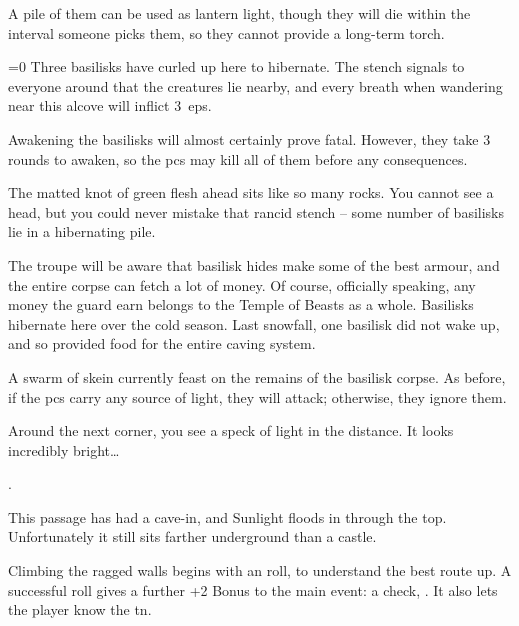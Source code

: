 \begin{multicols}{2}
A pile of them can be used as lantern light, though they will die within the \gls{interval} someone picks them, so they cannot provide a long-term torch.


\ifnum\value{temperature}=0
  Three basilisks have curled up here to hibernate.
  The stench signals to everyone around that the creatures lie nearby, and every breath when wandering near this alcove will inflict 3~\glspl{ep}.

  Awakening the basilisks will almost certainly prove fatal.
  However, they take 3 rounds to awaken, so the \glspl{pc} may kill all of them before any consequences.

  \begin{boxtext}
    The matted knot of green flesh ahead sits like so many rocks.
    You cannot see a head, but you could never mistake that rancid stench -- some number of basilisks lie in a hibernating pile.
  \end{boxtext}


  The troupe will be aware that basilisk hides make some of the best armour, and the entire corpse can fetch a lot of money.
  Of course, officially speaking, any money the \gls{guard} earn belongs to the Temple of Beasts as a whole.%
\else
  Basilisks hibernate here over the cold season.
  Last snowfall, one basilisk did not wake up, and so provided food for the entire caving system.

  A swarm of skein currently feast on the remains of the basilisk corpse.
  As before, if the \glspl{pc} carry any source of light, they will attack; otherwise, they ignore them.

  \skeinSwarm

\fi

\begin{boxtext}
  Around the next corner, you see a speck of light in the distance.
  It looks incredibly bright\ldots
\end{boxtext}

.


This passage has had a cave-in, and Sunlight floods in through the top.
Unfortunately it still sits farther underground than a castle.

Climbing the ragged walls begins with an  roll, to understand the best route up.
A successful roll gives a further +2 Bonus to the main event: a  check, \tn[14].
It also lets the player know the \gls{tn}.


\end{multicols}
